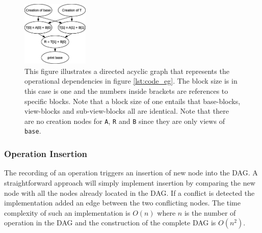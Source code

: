 \documentclass[preprint]{../PGAS10/sigplanconf}
\begin{document}
\begin{figure}
 \centering
 \includegraphics[width=120px]{gfx/dag}
 \caption{This figure illustrates a directed acyclic graph that represents the operational dependencies in figure \ref{lst:code_eg}. The block size is in this case is one and the numbers inside brackets are references to specific blocks. Note that a block size of one entails that base-blocks, view-blocks and sub-view-blocks all are identical. Note that there are no creation nodes for \texttt{A}, \texttt{R} and \texttt{B} since they are only views of \texttt{base}.}
 \label{fig:DAG}
\end{figure}


\subsubsection{Operation Insertion}
The recording of an operation triggers an insertion of new node into the DAG. A straightforward approach will simply implement insertion by comparing the new node with all the nodes already located in the DAG. If a conflict is detected the implementation added an edge between the two conflicting nodes. The time complexity of such an implementation is $O(n)$ where $n$ is the number of operation in the DAG and the construction of the complete DAG is $O(n^2)$.

\end{document}
